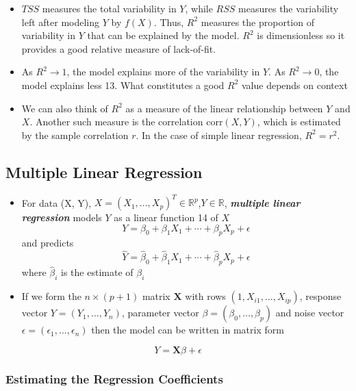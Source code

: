 \documentclass[11pt]{article}
\begin{document}
\begin{itemize}
\item
  \(TSS\) measures the total variability in \(Y\), while \(RSS\)
  measures the variability left after modeling \(Y\) by \(f(X)\). Thus,
  \(R^2\) measures the proportion of variability in \(Y\) that can be
  explained by the model. \(R^2\) is dimensionless so it provides a good
  relative measure of lack-of-fit.
\item
  As \(R^2 \rightarrow 1\), the model explains more of the variability
  in \(Y\). As \(R^2 \rightarrow 0\), the model explains less 13. What
  constitutes a good \(R^2\) value depends on context
\item
  We can also think of \(R^2\) as a measure of the linear relationship
  between \(Y\) and \(X\). Another such measure is the correlation
  \(\text{corr}(X,Y)\), which is estimated by the sample correlation
  \(r\). In the case of simple linear regression, \(R^2 = r^2\).
\end{itemize}

    \hypertarget{multiple-linear-regression}{%
\subsection{Multiple Linear
Regression}\label{multiple-linear-regression}}

    \begin{itemize}
\item
  For data (X, Y),
  \(X=(X_1,\dots,X_p)^T\in\mathbb{R}^p\),\(Y\in\mathbb{R}\),
  \textbf{\emph{multiple linear regression}} models \(Y\) as a linear
  function 14 of \(X\)
  \[Y = \beta_0 + \beta_1 X_1 + \cdots + \beta_p X_p + \epsilon\] and
  predicts
  \[\hat{Y} = \hat{\beta}_0 + \hat{\beta}_1 X_1 + \cdots + \hat{\beta}_p X_p  + \epsilon \]
  where \(\hat{\beta}_i\) is the estimate of \(\beta_i\)
\item
  If we form the \(n \times (p + 1)\) matrix \(\mathbf{X}\) with rows
  \((1, X_{i1}, \dots, X_{ip})\), response vector \(Y=(Y_1,\dots,Y_n)\),
  parameter vector \(\beta = (\beta_0, \dots, \beta_p)\) and noise
  vector \(\epsilon = (\epsilon_1, \dots, \epsilon_n)\) then the model
  can be written in matrix form
\end{itemize}

\[ Y = \mathbf{X}\beta + \epsilon \]

    \hypertarget{estimating-the-regression-coefficients}{%
\subsubsection{Estimating the Regression
Coefficients}\label{estimating-the-regression-coefficients}}
\end{document}
